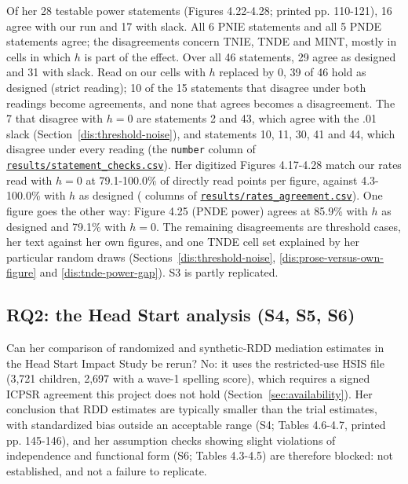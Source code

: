 Of her 28 testable power statements (Figures 4.22-4.28; printed pp. 110-121), 16 agree with our run and 17 with slack. All 6 PNIE statements and all 5 PNDE statements agree; the disagreements concern TNIE, TNDE and MINT, mostly in cells in which $h$ is part of the effect. Over all 46 statements, 29 agree as designed and 31 with slack. Read on our cells with $h$ replaced by 0, 39 of 46 hold as designed (strict reading); 10 of the 15 statements that disagree under both readings become agreements, and none that agrees becomes a disagreement. The 7 that disagree with $h = 0$ are statements 2 and 43, which agree with the .01 slack (Section~\ref{dis:threshold-noise}), and statements 10, 11, 30, 41 and 44, which disagree under every reading (the \texttt{number} column of \href{https://github.com/alectionary/vibe-math/blob/master/formalization/chen-rdd-mediation/results/statement_checks.csv}{\nolinkurl{results/statement_checks.csv}}). Her digitized Figures 4.17-4.28 match our rates read with $h = 0$ at 79.1-100.0\% of directly read points per figure, against 4.3-100.0\% with $h$ as designed (\texttt{} columns of \href{https://github.com/alectionary/vibe-math/blob/master/formalization/chen-rdd-mediation/results/rates_agreement.csv}{\nolinkurl{results/rates_agreement.csv}}). One figure goes the other way: Figure 4.25 (PNDE power) agrees at 85.9\% with $h$ as designed and 79.1\% with $h = 0$. The remaining disagreements are threshold cases, her text against her own figures, and one TNDE cell set explained by her particular random draws (Sections~\ref{dis:threshold-noise}, \ref{dis:prose-versus-own-figure} and \ref{dis:tnde-power-gap}). S3 is partly replicated.

\subsection{RQ2: the Head Start analysis (S4, S5, S6)}\label{sec:rq2}

Can her comparison of randomized and synthetic-RDD mediation estimates in the Head Start Impact Study be rerun? No: it uses the restricted-use HSIS file (3,721 children, 2,697 with a wave-1 spelling score), which requires a signed ICPSR agreement this project does not hold (Section~\ref{sec:availability}). Her conclusion that RDD estimates are typically smaller than the trial estimates, with standardized bias outside an acceptable range (S4; Tables 4.6-4.7, printed pp. 145-146), and her assumption checks showing slight violations of independence and functional form (S6; Tables 4.3-4.5) are therefore blocked: not established, and not a failure to replicate.

